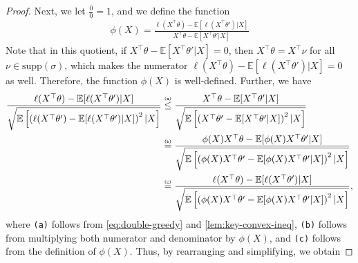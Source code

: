 \documentclass[letter, 12pt]{report}
\newcommand{\explan}[1]{\stackrel{\text{\tiny \texttt{#1}}}}
\newcommand{\E}{\mathbb E}
\newcommand{\I}{\mathcal{I}}
\newcommand{\1}{\mathbf{1}}
\newcommand{\ts}{\textsc{TS}\xspace}
\theoremstyle{plain}
\theoremstyle{definition}
\theoremstyle{remark}
\begin{document}
\begin{proof}
    Next, we let $\tfrac{0}{0}=1$, and we define the function
    \begin{align*}
        \phi(X) =\frac{
            \ell(X^\top \theta) - \E[\ell(X^\top \theta')|X]
        }{
            X^\top \theta - \E[X^\top \theta'|X]
        }
    \end{align*}
    Note that in this quotient,
    if $X^\top \theta - \E[X^\top \theta'|X] = 0$, then $X^\top \theta = X^\top \nu$ for all $\nu \in \text{supp}(\sigma)$, which makes the numerator $\ell(X^\top \theta) - \E[\ell(X^\top \theta')|X] = 0$ as well.
    Therefore, the function $\phi(X)$ is well-defined.
    Further, we have
    \begin{align*}
        \frac{
            \ell(X^\top \theta) - \E[\ell(X^\top \theta')|X]
        }{
            \sqrt{
                \E\left[
                    \left(\ell(X^\top \theta') - \E[\ell(X^\top \theta')|X]\right)^2
                    |X
                    \right]
            }
        }
         &
        \explan{(a)}
        \leq
        \frac{
            X^\top \theta - \E[X^\top \theta'|X]
        }{
            \sqrt{
                \E\left[
                    \left(X^\top \theta' - \E[X^\top \theta'|X]\right)^2
                    |X
                    \right]
            }
        }
        \\
         &
        \explan{(b)}
        =
        \frac{
            \phi(X) X^\top \theta - \E[\phi(X)X^\top \theta'|X]
        }{
            \sqrt{
                \E\left[
                    \left(\phi(X) X^\top \theta' - \E[\phi(X)X^\top \theta'|X]\right)^2
                    |X
                    \right]
            }
        }
        \\
         &
        \explan{(c)}
        =
        \frac{
            \ell(X^\top \theta) - \E[\ell(X^\top \theta')|X]
        }{
            \sqrt{
                \E\left[
                    \left(\phi(X) X^\top \theta' - \E[\phi(X)X^\top \theta'|X]\right)^2
                    |X
                    \right]
            }
        },
    \end{align*}
    where \texttt{(a)} follows from \cref{eq:double-greedy} and \cref{lem:key-convex-ineq},
    \texttt{(b)} follows from multiplying both
    numerator and denominator by $\phi(X)$,
    and \texttt{(c)} follows from the definition of $\phi(X)$.
    Thus, by rearranging and simplifying, we obtain

\end{proof}
\end{document}
